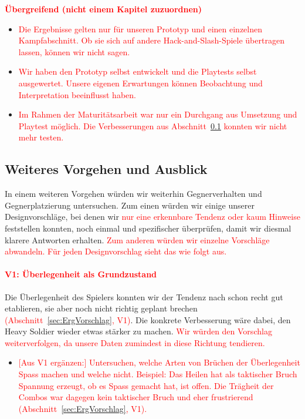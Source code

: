 \documentclass[../Main.tex]{subfiles}
\begin{document}
\textcolor{red}{\textbf{Übergreifend (nicht einem Kapitel zuzuordnen)}}
\begin{itemize}[leftmargin=1.5cm]
    \item \textcolor{red}{Die Ergebnisse gelten nur für unseren Prototyp und einen einzelnen Kampfabschnitt. Ob sie sich auf andere Hack-and-Slash-Spiele übertragen lassen, können wir nicht sagen.}
    \item \textcolor{red}{Wir haben den Prototyp selbst entwickelt und die Playtests selbst ausgewertet. Unsere eigenen Erwartungen können Beobachtung und Interpretation beeinflusst haben.}
    \item \textcolor{red}{Im Rahmen der Maturitätsarbeit war nur ein Durchgang aus Umsetzung und Playtest möglich. Die Verbesserungen aus Abschnitt~\ref{sec:Verbesserungen} konnten wir nicht mehr testen.}
\end{itemize}

\subsection{Weiteres Vorgehen und Ausblick} \label{sec:Verbesserungen}

In einem weiteren Vorgehen würden wir weiterhin Gegnerverhalten und Gegnerplatzierung untersuchen. Zum einen würden wir einige unserer Designvorschläge, bei denen wir \textcolor{red}{nur eine erkennbare Tendenz oder kaum Hinweise} feststellen konnten, noch einmal und spezifischer überprüfen, damit wir diesmal klarere Antworten erhalten. \textcolor{red}{Zum anderen würden wir einzelne Vorschläge abwandeln. Für jeden Designvorschlag sieht das wie folgt aus.}

\paragraph{\textcolor{red}{V1: Überlegenheit als Grundzustand}}
Die Überlegenheit des Spielers konnten wir der Tendenz nach schon recht gut etablieren, sie aber noch nicht richtig geplant brechen \textcolor{red}{(Abschnitt~\ref{sec:ErgVorschlag}, V1)}. Die konkrete Verbesserung wäre dabei, den Heavy Soldier wieder etwas stärker zu machen. \textcolor{red}{Wir würden den Vorschlag weiterverfolgen, da unsere Daten zumindest in diese Richtung tendieren.}

\begin{itemize}[leftmargin=1.5cm]
    \item \textcolor{red}{[Aus V1 ergänzen:] Untersuchen, welche Arten von Brüchen der Überlegenheit Spass machen und welche nicht. Beispiel: Das Heilen hat als taktischer Bruch Spannung erzeugt, ob es Spass gemacht hat, ist offen. Die Trägheit der Combos war dagegen kein taktischer Bruch und eher frustrierend (Abschnitt~\ref{sec:ErgVorschlag}, V1).}
\end{itemize}
\end{document}
